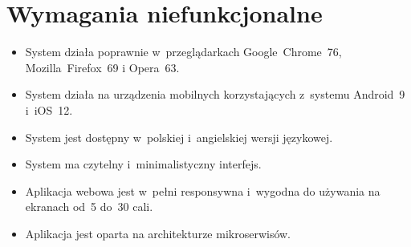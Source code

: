 \newpage

\section{Wymagania niefunkcjonalne}\label{sec:nonfunctional-requirements}
\begin{itemize}
    \item System działa poprawnie w~przeglądarkach Google~Chrome~76, Mozilla~Firefox~69 i Opera~63.
    \item System działa na urządzenia mobilnych korzystających z~systemu Android~9 i~iOS~12.
    \item System jest dostępny w~polskiej i~angielskiej wersji językowej.
    \item System ma czytelny i~minimalistyczny interfejs.
    \item Aplikacja webowa jest w~pełni responsywna i~wygodna do używania na ekranach od~5 do~30 cali.
    \item Aplikacja jest oparta na architekturze mikroserwisów.
\end{itemize}
\thispagestyle{normal}

